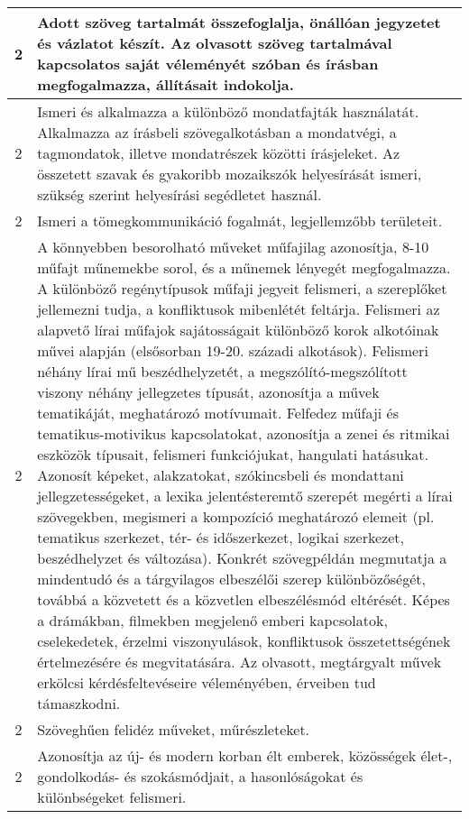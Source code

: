 \begin{longtable}{c | p{12cm} }
                                
                                          2 &  Adott szöveg tartalmát összefoglalja, önállóan jegyzetet és vázlatot készít. Az olvasott szöveg tartalmával kapcsolatos saját véleményét szóban és írásban megfogalmazza, állításait indokolja. \\ \hline
                                          2 &  Ismeri és alkalmazza a különböző mondatfajták használatát. Alkalmazza az írásbeli szövegalkotásban a mondatvégi, a tagmondatok, illetve mondatrészek közötti írásjeleket. Az összetett szavak és gyakoribb mozaikszók helyesírását ismeri, szükség szerint helyesírási segédletet használ. \\ \hline
                                          2 &  Ismeri a tömegkommunikáció fogalmát, legjellemzőbb területeit. \\ \hline
                                          2 &  A könnyebben besorolható műveket műfajilag azonosítja, 8-10 műfajt műnemekbe sorol, és a műnemek lényegét megfogalmazza. A különböző regénytípusok műfaji jegyeit felismeri, a szereplőket jellemezni tudja, a konfliktusok mibenlétét feltárja. Felismeri az alapvető lírai műfajok sajátosságait különböző korok alkotóinak művei alapján (elsősorban 19-20. századi alkotások). Felismeri néhány lírai mű beszédhelyzetét, a megszólító-megszólított viszony néhány jellegzetes típusát, azonosítja a művek tematikáját, meghatározó motívumait. Felfedez műfaji és tematikus-motivikus kapcsolatokat, azonosítja a zenei és ritmikai eszközök típusait, felismeri funkciójukat, hangulati hatásukat. Azonosít képeket, alakzatokat, szókincsbeli és mondattani jellegzetességeket, a lexika jelentésteremtő szerepét megérti a lírai szövegekben, megismeri a kompozíció meghatározó elemeit (pl. tematikus szerkezet, tér- és időszerkezet, logikai szerkezet, beszédhelyzet és változása). Konkrét szövegpéldán megmutatja a mindentudó és a tárgyilagos elbeszélői szerep különbözőségét, továbbá a közvetett és a közvetlen elbeszélésmód eltérését. Képes a drámákban, filmekben megjelenő emberi kapcsolatok, cselekedetek, érzelmi viszonyulások, konfliktusok összetettségének értelmezésére és megvitatására. Az olvasott, megtárgyalt művek erkölcsi kérdésfeltevéseire véleményében, érveiben tud támaszkodni. \\ \hline
                                          2 &  Szöveghűen felidéz műveket, műrészleteket. \\ \hline
                                          2 &  Azonosítja az új- és modern korban élt emberek, közösségek élet-, gondolkodás- és szokásmódjait, a hasonlóságokat és különbségeket felismeri.

\end{longtable}
